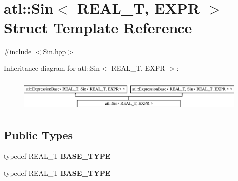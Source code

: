 \hypertarget{structatl_1_1_sin}{\section{atl\+:\+:Sin$<$ R\+E\+A\+L\+\_\+\+T, E\+X\+P\+R $>$ Struct Template Reference}
\label{structatl_1_1_sin}
}


{\ttfamily \#include $<$Sin.\+hpp$>$}

Inheritance diagram for atl\+:\+:Sin$<$ R\+E\+A\+L\+\_\+\+T, E\+X\+P\+R $>$\+:\begin{figure}[H]
\begin{center}
\leavevmode
\includegraphics[height=1.656805cm]{structatl_1_1_sin}
\end{center}
\end{figure}
\subsection*{Public Types}
\begin{DoxyCompactItemize}
\item 
\hypertarget{structatl_1_1_sin_a4d1a2c2f3e07204d313f386dd2133778}{typedef R\+E\+A\+L\+\_\+\+T {\bfseries B\+A\+S\+E\+\_\+\+T\+Y\+P\+E}}\label{structatl_1_1_sin_a4d1a2c2f3e07204d313f386dd2133778}

\item 
\hypertarget{structatl_1_1_sin_a4d1a2c2f3e07204d313f386dd2133778}{typedef R\+E\+A\+L\+\_\+\+T {\bfseries B\+A\+S\+E\+\_\+\+T\+Y\+P\+E}}\label{structatl_1_1_sin_a4d1a2c2f3e07204d313f386dd2133778}

\end{DoxyCompactItemize}
